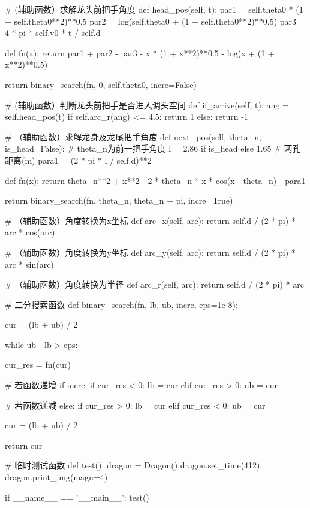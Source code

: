 \documentclass[withoutpreface,bwprint]{cumcmthesis}
\begin{document}
\begin{CodeText}
# (辅助函数）求解龙头前把手角度
def head_pos(self, t):
   par1 = self.theta0 * (1 + self.theta0**2)**0.5
   par2 = log(self.theta0 + (1 + self.theta0**2)**0.5)
   par3 = 4 * pi * self.v0 * t / self.d

   def fn(x):
      return par1 + par2 - par3 - x * (1 + x**2)**0.5 - log(x + (1 + x**2)**0.5)

   return binary_search(fn, 0, self.theta0, incre=False)

# (辅助函数）判断龙头前把手是否进入调头空间
def if_arrive(self, t):
   ang = self.head_pos(t)
   if self.arc_r(ang) <= 4.5:
      return 1
   else:
      return -1

# （辅助函数）求解龙身及龙尾把手角度
def next_pos(self, theta_n, is_head=False): # theta_n为前一把手角度
   l = 2.86 if is_head else 1.65 # 两孔距离(m)
   para1 = (2 * pi * l / self.d)**2

   def fn(x):
      return theta_n**2 + x**2 - 2 * theta_n * x * cos(x - theta_n) - para1

   return binary_search(fn, theta_n, theta_n + pi, incre=True)

# （辅助函数）角度转换为x坐标
def arc_x(self, arc):
   return self.d / (2 * pi) * arc * cos(arc)


   # （辅助函数）角度转换为y坐标
   def arc_y(self, arc):
      return self.d / (2 * pi) * arc * sin(arc)

   # （辅助函数）角度转换为半径
   def arc_r(self, arc):
      return self.d / (2 * pi) * arc


# 二分搜索函数
def binary_search(fn, lb, ub, incre, eps=1e-8):

   cur = (lb + ub) / 2

   while ub - lb > eps:

      cur_res = fn(cur)

      # 若函数递增
      if incre:
            if cur_res < 0:
                lb = cur
            elif cur_res > 0:
                ub = cur

      # 若函数递减
      else:
            if cur_res > 0:
                lb = cur
            elif cur_res < 0:
                ub = cur

      cur = (lb + ub) / 2

   return cur


# 临时测试函数
def test():
   dragon = Dragon()
   dragon.set_time(412)
   dragon.print_img(magn=4)


if __name__ == '__main__':
   test()
\end{CodeText}
\end{document}
